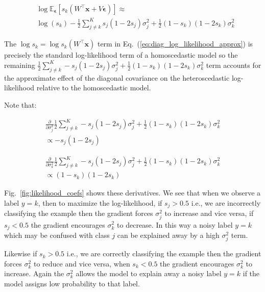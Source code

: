 \documentclass[final]{cvpr}
\newcommand{\brac}[1]{\left[#1\right]}
\begin{document}
\begin{equation}
\begin{split}
    &\log \mathbb{E}_{\boldsymbol{\epsilon}} \brac{s_k(W^\intercal \mathbf{x} + V \boldsymbol{\epsilon})} \approx \\ & \log(s_k) -  \frac{1}{2} \sum_{j \neq k}^K s_j (1 - 2 s_j) \sigma_j^2 + \frac{1}{2} (1 - s_k) (1 - 2 s_k) \sigma_k^2
\end{split}
\label{eq:diag_log_likelihood_approx}    
\end{equation}

The $\log s_k = \log s_k(W^\intercal \mathbf{x})$ term in Eq.~(\ref{eq:diag_log_likelihood_approx}) is precisely the standard log-likelihood term of a homoscedastic model so the remaining $\frac{1}{2} \sum_{j \neq k}^K -s_j (1 - 2 s_j) \sigma_j^2 + \frac{1}{2} (1 - s_k) (1 - 2 s_k) \sigma_k^2$ term accounts for the approximate effect of the diagonal covariance on the heteroscedastic log-likelihood relative to the homoscedastic model.

Note that:

\begin{equation}
\begin{split}
    \frac{\partial}{\partial \sigma_j^2} \frac{1}{2} \sum_{j \neq k}^K -s_j (1 - 2 s_j) \sigma_j^2 + \frac{1}{2} (1 - s_k) (1 - 2 s_k) \sigma_k^2 \\ \propto -s_j (1 - 2 s_j)
\end{split}
\end{equation}

\begin{equation}
\begin{split}
    \frac{\partial}{\partial \sigma_k^2} \frac{1}{2} \sum_{j \neq k}^K -s_j (1 - 2 s_j) \sigma_j^2 + \frac{1}{2} (1 - s_k) (1 - 2 s_k) \sigma_k^2 \\ \propto (1 - s_k) (1 - 2 s_k)
\end{split}
\end{equation}

Fig.\ \ref{fig:likelihood_coefs} shows these derivatives. We see that when we observe a label $y = k$, then to maximize the log-likelihood, if $s_j > 0.5$ i.e., we are incorrectly classifying the example then the gradient forces $\sigma_j^2$ to increase and vice versa, if $s_j < 0.5$ the gradient encourages $\sigma_k^2$ to decrease. In this way a noisy label $y = k$ which may be confused with class $j$ can be explained away by a high $\sigma_j^2$ term.

Likewise if $s_k > 0.5$ i.e., we are correctly classifying the example then the gradient forces $\sigma_k^2$ to reduce and vice versa, when $s_k < 0.5$ the gradient encourages $\sigma_k^2$ to increase. Again the $\sigma_k^2$ allows the model to explain away a noisy label $y = k$ if the model assigns low probability to that label.
\end{document}
